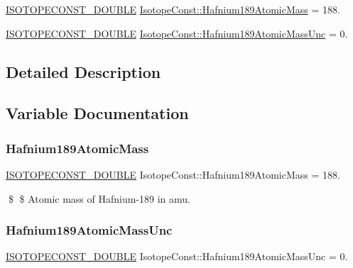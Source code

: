 \begin{DoxyCompactItemize}
\item 
\mbox{\hyperlink{group___isotope_const-_macros_ga8f45a7272ce02c0b4c65c44636ed719a}{I\+S\+O\+T\+O\+P\+E\+C\+O\+N\+S\+T\+\_\+\+D\+O\+U\+B\+LE}} \mbox{\hyperlink{group___isotope_const-_hafnium-_hf189_gaebed0bfcecf07aeadc4f172df087ca55}{Isotope\+Const\+::\+Hafnium189\+Atomic\+Mass}} = 188.
\item 
\mbox{\hyperlink{group___isotope_const-_macros_ga8f45a7272ce02c0b4c65c44636ed719a}{I\+S\+O\+T\+O\+P\+E\+C\+O\+N\+S\+T\+\_\+\+D\+O\+U\+B\+LE}} \mbox{\hyperlink{group___isotope_const-_hafnium-_hf189_gaf55c3e6b858067de804bedc1853cc846}{Isotope\+Const\+::\+Hafnium189\+Atomic\+Mass\+Unc}} = 0.
\end{DoxyCompactItemize}


\subsection{Detailed Description}


\subsection{Variable Documentation}
\mbox{\label{group___isotope_const-_hafnium-_hf189_gaebed0bfcecf07aeadc4f172df087ca55}} 
\subsubsection{\texorpdfstring{Hafnium189\+Atomic\+Mass}{Hafnium189AtomicMass}}
{\footnotesize\ttfamily \mbox{\hyperlink{group___isotope_const-_macros_ga8f45a7272ce02c0b4c65c44636ed719a}{I\+S\+O\+T\+O\+P\+E\+C\+O\+N\+S\+T\+\_\+\+D\+O\+U\+B\+LE}} Isotope\+Const\+::\+Hafnium189\+Atomic\+Mass = 188.}

\$ \$ Atomic mass of Hafnium-\/189 in amu. \mbox{\label{group___isotope_const-_hafnium-_hf189_gaf55c3e6b858067de804bedc1853cc846}} 
\subsubsection{\texorpdfstring{Hafnium189\+Atomic\+Mass\+Unc}{Hafnium189AtomicMassUnc}}
{\footnotesize\ttfamily \mbox{\hyperlink{group___isotope_const-_macros_ga8f45a7272ce02c0b4c65c44636ed719a}{I\+S\+O\+T\+O\+P\+E\+C\+O\+N\+S\+T\+\_\+\+D\+O\+U\+B\+LE}} Isotope\+Const\+::\+Hafnium189\+Atomic\+Mass\+Unc = 0.}

